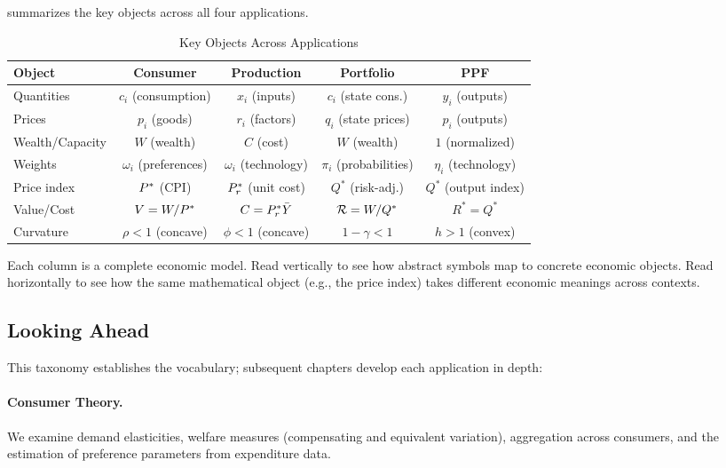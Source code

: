  summarizes the key objects across all four applications.

\begin{table}[H]
\centering
\caption{Key Objects Across Applications}
\label{tab:four-contexts}
\renewcommand{\arraystretch}{1.5}
\small
\begin{tabular}{@{}l c c c c@{}}
\toprule
\textbf{Object} & \textbf{Consumer} & \textbf{Production} & \textbf{Portfolio} & \textbf{PPF} \\
\midrule
Quantities & $c_i$ (consumption) & $x_i$ (inputs) & $c_i$ (state cons.) & $y_i$ (outputs) \\
Prices & $p_i$ (goods) & $r_i$ (factors) & $q_i$ (state prices) & $p_i$ (outputs) \\
Wealth/Capacity & $W$ (wealth) & $C$ (cost) & $W$ (wealth) & $1$ (normalized) \\
Weights & $\omega_i$ (preferences) & $\omega_i$ (technology) & $\pi_i$ (probabilities) & $\eta_i$ (technology) \\
Price index & $P^{*}$ (CPI) & $P^{*}_r$ (unit cost) & $Q^*$ (risk-adj.) & $Q^*$ (output index) \\
Value/Cost & $V = W/P^{*}$ & $C = P^{*}_r \bar{Y}$ & $\mathcal{R} = W/Q^*$ & $R^* = Q^*$ \\
Curvature & $\rho < 1$ (concave) & $\phi < 1$ (concave) & $1-\gamma < 1$ & $h > 1$ (convex) \\
\bottomrule
\end{tabular}
\end{table}

\begin{callouttip}
Each column is a complete economic model. Read vertically to see how abstract symbols map to concrete economic objects. Read horizontally to see how the same mathematical object (e.g., the price index) takes different economic meanings across contexts.
\end{callouttip}

\subsection{Looking Ahead}
\label{subsec:looking-ahead}

This taxonomy establishes the vocabulary; subsequent chapters develop each application in depth:

\paragraph{Consumer Theory.}
We examine demand elasticities, welfare measures (compensating and equivalent variation), aggregation across consumers, and the estimation of preference parameters from expenditure data.

